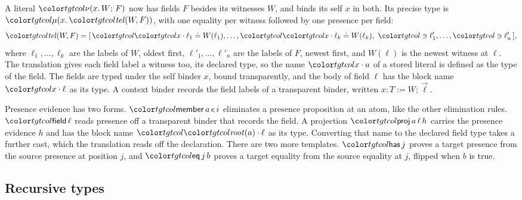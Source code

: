 A literal $\lit[x]{W}{F}$ now has fields $F$ besides its witnesses $W$, and binds its self $x$ in both. Its precise type is $\obj[x]{\ofLit{W}{F}}$, with one equality per witness followed by one presence per field:
\[
\ofLit{W}{F} = [\,\peq{\sel{x}{\ell_1}}{W(\ell_1)}, \ldots, \peq{\sel{x}{\ell_k}}{W(\ell_k)},\ \phas{\ell'_1}, \ldots, \phas{\ell'_n}\,] ,
\]
where $\ell_1, \ldots, \ell_k$ are the labels of $W$, oldest first, $\ell'_1, \ldots, \ell'_n$ are the labels of $F$, newest first, and $W(\ell)$ is the newest witness at $\ell$. The translation gives each field label a witness too, its declared type, so the name $\sel{x}{a}$ of a stored literal is defined as the type of the field. The fields are typed under the self binder $x$, bound transparently, and the body of field $\ell$ has the block name $\sel{x}{\ell}$ as its type. A context binder records the field labels of a transparent binder, written $x : T \mathrel{:=} W ; \vec\ell$.

Presence evidence has two forms. $\ev{member}\,a\,e\,i$ eliminates a presence proposition at an atom, like the other elimination rules. $\ev{field}\,\ell$ reads presence off a transparent binder that records the field. A projection $\ev{proj}\,a\,\ell\,h$ carries the presence evidence $h$ and has the block name $\sel{\rt{a}}{\ell}$ as its type. Converting that name to the declared field type takes a further cast, which the translation reads off the declaration. There are two more templates. $\ev{has}\,j$ proves a target presence from the source presence at position $j$, and $\ev{eq}\,j\,b$ proves a target equality from the source equality at $j$, flipped when $b$ is true.

\subsection{Recursive types}\label{sec:target-rec}

